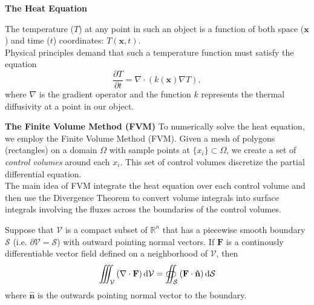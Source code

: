 \documentclass[final]{beamer}
\begin{document}
\begin{frame}{\textbf{The Heat Equation}}

The temperature ($T$) at any point in such an object is a function of both space ($\mathbf{x}$) and time ($t$) coordinates: $T(\mathbf{x},t)$.\\\vspace{1em}\pause
Physical principles demand that such a temperature function must satisfy the equation
\begin{equation}
	\frac{\partial T}{\partial t}=\nabla\cdot\left(k(\mathbf{x})\nabla T\right)\label{eqn:HeatEq},
\end{equation}
where $\nabla$ is the gradient operator and the function $k$ represents the thermal diffusivity at a point in our object.
\end{frame}

\begin{frame}[t]{\bf The Finite Volume Method (FVM)}
	To numerically solve the heat equation, we employ the Finite Volume Method (FVM).\pause
	\vfill
	Given a mesh of polygons (rectangles) on a domain $\Omega$ with sample points at $\lbrace x_i\rbrace\subset\Omega$, we create a set of \textit{control volumes} around each $x_i$. This set of control volumes discretize the partial differential equation.\\\vfill\pause
	The main idea of FVM integrate the heat equation over each control volume and then use the Divergence Theorem to convert volume integrals into surface integrals involving the fluxes across the boundaries of the control volumes.
	\vfill
\end{frame}

\begin{frame}[plain]
	\begin{theorem}
		Suppose that $\mathcal{V}$ is a compact subset of $\mathbb{R}^n$ that has a piecewise smooth boundary $\mathcal{S}$ (i.e. $\partial\mathcal{V}=\mathcal{S}$) with outward pointing normal vectors. If $\mathbf{F}$ is a continously differentiable vector field defined on a neighborhood of $\mathcal{V}$, then
		\begin{equation}
			\iiint_{\mathcal{V}}\left(\nabla\cdot\mathbf{F}\right)\dif\mathcal{V}=\oiint_{\mathcal{S}}\left(\mathbf{F}\cdot\mathbf{\hat{n}}\right)\dif\mathcal{S}\label{eqn:div-thm}
		\end{equation}
		where $\hat{\mathbf{n}}$ is the outwards pointing normal vector to the boundary.
		\label{thm:div-thm}
	\end{theorem}
\end{frame}
\end{document}
